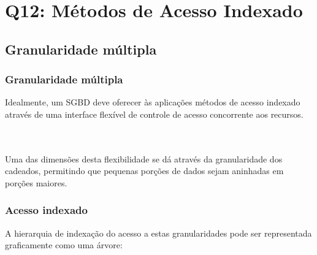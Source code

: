 \documentclass{beamer}
\begin{document}
\section{Q12: Métodos de Acesso Indexado}

\subsection{Granularidade múltipla}

\begin{frame}
    \frametitle{Granularidade múltipla}
    
    Idealmente, um SGBD deve oferecer às aplicações métodos de acesso indexado através de uma interface flexível de controle de acesso concorrente aos recursos.
    
    \\~\\
    Uma das dimensões desta flexibilidade se dá através da granularidade dos cadeados, permitindo que pequenas porções de dados sejam aninhadas em porções maiores.
\end{frame}

\begin{frame}
    \frametitle{Acesso indexado}    
    A hierarquia de indexação do acesso a estas granularidades pode ser representada graficamente como uma árvore:
    
    \\~\\
    
\end{frame}
    
    
\end{document}
